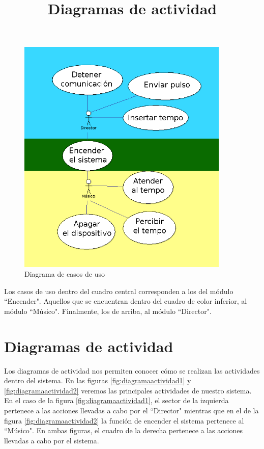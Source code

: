 \begin{figure}[!htb]
\centering
\includegraphics[width=0.9\textwidth]{./imagenes/diagramacasosuso}
\caption{Diagrama de casos de uso} \label{fig:diagramacasosdeuso}
\end{figure}

Los casos de uso dentro del cuadro central corresponden a los del módulo ``Encender".
Aquellos que se encuentran dentro del cuadro de color inferior, al módulo ``Músico". Finalmente,
los de arriba, al módulo ``Director".\\

\section{Diagramas de actividad}
\title{Diagramas de actividad}

Los diagramas de actividad nos permiten conocer cómo se realizan
las actividades dentro del sistema. En las figuras \ref{fig:diagramaactividad1} y \ref{fig:diagramaactividad2}
veremos las principales actividades de nuestro sistema. En el caso de la figura \ref{fig:diagramaactividad1},
el sector de la izquierda pertenece a las acciones llevadas a cabo por el ``Director" mientras que en el de la figura
\ref{fig:diagramaactividad2} la función de encender el sistema pertenece al ``Músico". En ambas
figuras, el cuadro de la derecha pertenece a las acciones llevadas a cabo por el sistema.\\

